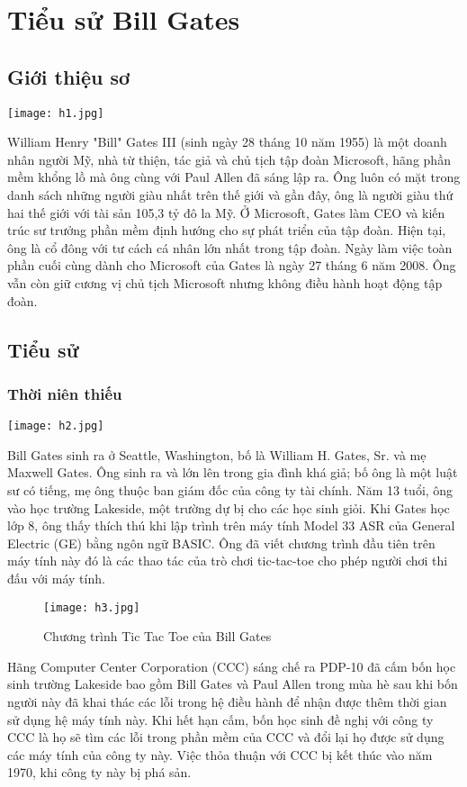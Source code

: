 \documentclass[12pt,a4paper]{article}  %
\begin{document}
 
 \section{Tiểu sử Bill Gates} 
 \subsection{Giới thiệu sơ}
 \begin{center}
 \texttt{[image: h1.jpg]}
 \end{center}
  William Henry "Bill" Gates III (sinh ngày 28 tháng 10 năm 1955) là một doanh nhân người Mỹ, nhà từ thiện, tác giả và chủ tịch tập đoàn Microsoft, hãng phần mềm khổng lồ mà ông cùng với Paul Allen đã sáng lập ra. Ông luôn có mặt trong danh sách những người giàu nhất trên thế giới và gần đây, ông là người giàu thứ hai thế giới với tài sản 105,3 tỷ đô la Mỹ. Ở Microsoft, Gates làm CEO và kiến trúc sư trưởng phần mềm định hướng cho sự phát triển của tập đoàn. Hiện tại, ông là cổ đông với tư cách cá nhân lớn nhất trong tập đoàn. Ngày làm việc toàn phần cuối cùng dành cho Microsoft của Gates là ngày 27 tháng 6 năm 2008. Ông vẫn còn giữ cương vị chủ tịch Microsoft nhưng không điều hành hoạt động tập đoàn.
  \subsection{Tiểu sử}
   \subsubsection{Thời niên thiếu} 
    \begin{center}
   		\texttt{[image: h2.jpg]}
   	\end{center}
   Bill Gates sinh ra ở Seattle, Washington, bố là William H. Gates, Sr. và mẹ Maxwell Gates. Ông sinh ra và lớn lên trong gia đình khá giả; bố ông là một luật sư có tiếng, mẹ ông thuộc ban giám đốc của công ty tài chính. Năm 13 tuổi, ông vào học trường Lakeside, một trường dự bị cho các học sinh giỏi. Khi Gates học lớp 8, ông thấy thích thú khi lập trình trên máy tính Model 33 ASR của General Electric (GE) bằng ngôn ngữ BASIC. Ông đã viết chương trình đầu tiên trên máy tính này đó là các thao tác của trò chơi tic-tac-toe cho phép người chơi thi đấu với máy tính.
   \begin{figure}[h!]
   	\centering
   	\texttt{[image: h3.jpg]}
   	\captionsetup{labelformat=empty}
   	\caption{Chương trình Tic Tac Toe của Bill Gates}
   \end{figure}
	Hãng Computer Center Corporation (CCC) sáng chế ra PDP-10 đã cấm bốn học sinh trường Lakeside bao gồm Bill Gates và Paul Allen trong mùa hè sau khi bốn người này đã khai thác các lỗi trong hệ điều hành để nhận được thêm thời gian sử dụng hệ máy tính này. Khi hết hạn cấm, bốn học sinh đề nghị với công ty CCC là họ sẽ tìm các lỗi trong phần mềm của CCC và đổi lại họ được sử dụng các máy tính của công ty này. Việc thỏa thuận với CCC bị kết thúc vào năm 1970, khi công ty này bị phá sản.
	
\end{document}
